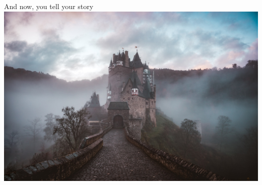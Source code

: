 
\begin{frame}{And now, you tell your story}
\centering
\includegraphics[height=0.7\textheight]{images/cederic-vandenberghe-21DP3hytVHw-unsplash.jpg}

\end{frame}

